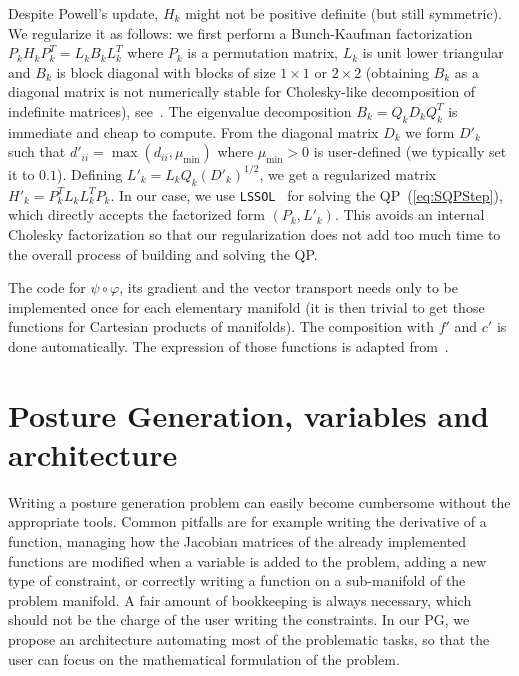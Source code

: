 Despite Powell's update, $H_{k}$ might not be positive definite (but still symmetric). We regularize it as follows: we first perform a Bunch-Kaufman factorization $P_k H_k P_k^T= L_k B_k L_k^T$ where $P_k$ is a permutation matrix, $L_k$ is unit lower triangular and $B_k$ is block diagonal with blocks of size $1 \times 1$ or $2\times 2$ (obtaining $B_k$ as a diagonal matrix is not numerically stable for Cholesky-like decomposition of indefinite matrices), see~\cite{golub:book:1996}. 
The eigenvalue decomposition $B_k = Q_k D_k Q_k^T$ is immediate and cheap to compute. From the diagonal matrix $D_k$ we form $D'_k$ such that $d'_{ii} = \max\left(d_{ii},\mu_{\min}\right)$ where $\mu_{\min}>0$ is user-defined (we typically set it to $0.1$). 
Defining $L'_k = L_k Q_k (D'_k)^{1/2}$, we get a regularized matrix $H'_k = P_k^T L_k L_k^T P_k$. In our case, we use {\tt LSSOL}~\cite{gill:techrep:1986} for solving the QP~(\ref{eq:SQPStep}), which directly accepts the factorized form $(P_k, L'_k)$. This avoids an internal Cholesky factorization so that our regularization does not add too much time to the overall process of building and solving the QP.

The code for $\psi\circ\varphi$, its gradient and the vector transport needs only to be implemented once for each elementary manifold (it is then trivial to get those functions for Cartesian products of manifolds). The composition with $f'$ and $c'$ is done automatically. The expression of those functions is adapted from~\cite{boumal:jmlr:2014}.

\section{Posture Generation, variables and architecture}
\label{sec:2}

Writing a posture generation problem can easily become cumbersome without the appropriate tools. 
Common pitfalls are for example writing the derivative of a function, managing how the Jacobian matrices of the already implemented functions are modified when a variable is added to the problem, adding a new type of constraint, or correctly writing a function on a sub-manifold of the problem manifold. 
A fair amount of bookkeeping is always necessary, which should not be the charge of the user writing the constraints.
In our PG, we propose an architecture automating most of the problematic tasks, so that the user can focus on the mathematical formulation of the problem.

